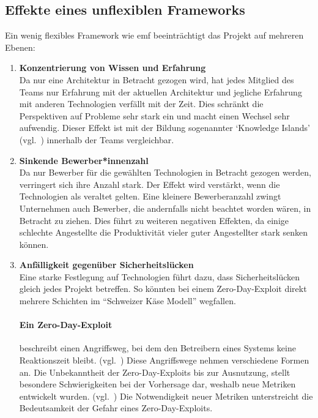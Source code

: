 \documentclass[./einleitung.tex]{subfiles}
\begin{document}
\subsection{Effekte eines unflexiblen Frameworks}\label{subsec:effekte-eines-unflexiblen-frameworks}
Ein wenig flexibles Framework wie \acrshort{emf} beeinträchtigt das Projekt auf mehreren Ebenen:
\begin{enumerate}
\item \textbf{Konzentrierung von Wissen und Erfahrung} \\
Da nur eine Architektur in Betracht gezogen wird, hat jedes Mitglied des Teams nur Erfahrung mit der aktuellen Architektur und jegliche Erfahrung mit anderen Technologien verfällt mit der Zeit.
Dies schränkt die Perspektiven auf Probleme sehr stark ein und macht einen Wechsel sehr aufwendig.
Dieser Effekt ist mit der Bildung sogenannter `Knowledge Islands' (vgl.~\cite{cury2024knowledge}) innerhalb der Teams vergleichbar.
\item \textbf{Sinkende Bewerber*innenzahl} \\
Da nur Bewerber für die gewählten Technologien in Betracht gezogen werden, verringert sich ihre Anzahl stark.
Der Effekt wird verstärkt, wenn die Technologien als veraltet gelten.
Eine kleinere Bewerberanzahl zwingt Unternehmen auch Bewerber, die andernfalls nicht beachtet worden wären, in Betracht zu ziehen.
Dies führt zu weiteren negativen Effekten, da einige schlechte Angestellte die Produktivität vieler guter Angestellter stark senken können.
\newpage
\item \textbf{Anfälligkeit gegenüber Sicherheitslücken} \\
Eine starke Festlegung auf Technologien führt dazu, dass Sicherheitslücken gleich jedes Projekt betreffen.
So könnten bei einem Zero-Day-Exploit direkt mehrere Schichten im ``Schweizer Käse Modell'' wegfallen.
\begin{center}
    \paragraph{Ein Zero-Day-Exploit} beschreibt einen Angriffsweg, bei dem den Betreibern eines Systems keine Reaktionszeit bleibt. (vgl.~\cite{ibmZeroDay})
    Diese Angriffswege nehmen verschiedene Formen an.
    Die Unbekanntheit der Zero-Day-Exploits bis zur Ausnutzung, stellt besondere Schwierigkeiten bei der Vorhersage dar, weshalb neue Metriken entwickelt wurden. (vgl.~\cite{wang2013k})
    Die Notwendigkeit neuer Metriken unterstreicht die Bedeutsamkeit der Gefahr eines Zero-Day-Exploits.
\end{center}


\end{enumerate}
\end{document}
